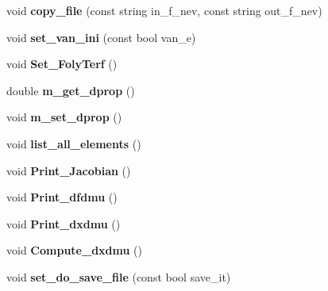 \begin{DoxyCompactItemize}
\item 
void {\bfseries copy\+\_\+file} (const string in\+\_\+f\+\_\+nev, const string out\+\_\+f\+\_\+nev)\hypertarget{class_staci_ac38df6cb7fb51eb595c17cd050a85073}{}\label{class_staci_ac38df6cb7fb51eb595c17cd050a85073}

\item 
void {\bfseries set\+\_\+van\+\_\+ini} (const bool van\+\_\+e)\hypertarget{class_staci_a0f2f821b672c0aa1a2f9a9117c2f67ef}{}\label{class_staci_a0f2f821b672c0aa1a2f9a9117c2f67ef}

\item 
void {\bfseries Set\+\_\+\+Foly\+Terf} ()\hypertarget{class_staci_ae13ac77f30c2f64ffbc44e9b271373ef}{}\label{class_staci_ae13ac77f30c2f64ffbc44e9b271373ef}

\item 
double {\bfseries m\+\_\+get\+\_\+dprop} ()\hypertarget{class_staci_a292d7cba265ab37d31bec35349fae1ac}{}\label{class_staci_a292d7cba265ab37d31bec35349fae1ac}

\item 
void {\bfseries m\+\_\+set\+\_\+dprop} ()\hypertarget{class_staci_a47fc932a04e285791a4cb4227e840004}{}\label{class_staci_a47fc932a04e285791a4cb4227e840004}

\item 
void {\bfseries list\+\_\+all\+\_\+elements} ()\hypertarget{class_staci_a690304659f0bf2283a4e5dc20177661f}{}\label{class_staci_a690304659f0bf2283a4e5dc20177661f}

\item 
void {\bfseries Print\+\_\+\+Jacobian} ()\hypertarget{class_staci_a4f664e6fe326b5592664b2b7239612f2}{}\label{class_staci_a4f664e6fe326b5592664b2b7239612f2}

\item 
void {\bfseries Print\+\_\+dfdmu} ()\hypertarget{class_staci_abe8ddaf47c48ac2429acc5fe9c8010a5}{}\label{class_staci_abe8ddaf47c48ac2429acc5fe9c8010a5}

\item 
void {\bfseries Print\+\_\+dxdmu} ()\hypertarget{class_staci_ac3b009354096542602b5a6849f5114d2}{}\label{class_staci_ac3b009354096542602b5a6849f5114d2}

\item 
void {\bfseries Compute\+\_\+dxdmu} ()\hypertarget{class_staci_abf31b6f78c548e42970b98941d35aba9}{}\label{class_staci_abf31b6f78c548e42970b98941d35aba9}

\item 
void {\bfseries set\+\_\+do\+\_\+save\+\_\+file} (const bool save\+\_\+it)\hypertarget{class_staci_a981510ebb2cb58d898fb258063d6f890}{}\label{class_staci_a981510ebb2cb58d898fb258063d6f890}

\end{DoxyCompactItemize}
